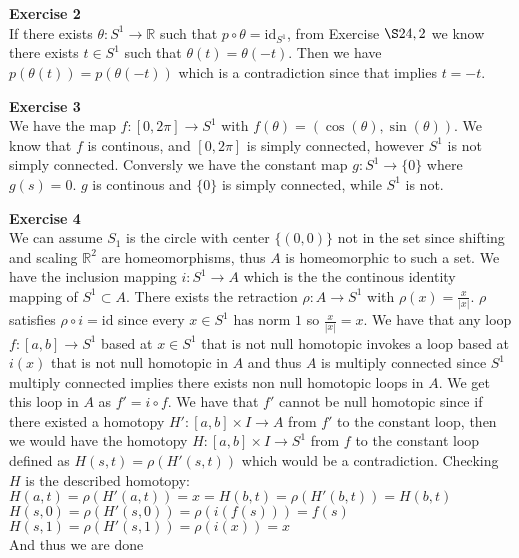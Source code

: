 \documentclass[12pt]{article}
\newenvironment{ques}[1]{\textbf{Exercise #1}\vspace{1 mm}\\ }{\bigskip}
\theoremstyle{definition}
\newcommand{\R}{\mathbb R}
\newcommand{\id}{\text{id}}
\newcommand{\s}{\sin}
\renewcommand{\t}{\theta}
\begin{document}
\begin{ques}{2}
	If there exists $\t : S^1 \to \R$ such that $p \circ \t = \id_{S^1}$, from
	Exercise $\S 24, 2$ we know there exists $t \in S^1$ such that $\t(t) =
	\t(-t)$. Then we have $p(\t(t)) = p(\t(-t))$ which is a contradiction since
	that implies $t = -t$.
\end{ques}

\begin{ques}{3}
	We have the map $f: [0,2\pi] \to S^1$ with $f(\theta) = (\cos(\t),
	\s(\t))$. We know that $f$ is continous, and $[0, 2\pi] $ is simply
	connected, however $S^1$ is not simply connected. Conversly we have the
	constant map $g: S^1 \to \{0\}$ where $g(s) = 0$. $g$ is continous and
	$\{0\}$ is simply connected, while $S^1$ is not.
\end{ques}

\begin{ques}{4}
	We can assume $S_1$ is the circle with center $\{(0,0)\}$ not in the set
	since shifting and scaling $\R^2$ are homeomorphisms, thus $A$ is
	homeomorphic to such a set. We have the inclusion mapping $i:S^1 \to A$
	which is the the continous identity mapping of $S^1 \subset A$. There exists the
	retraction $\rho: A \to S^1$ with $\rho(x) = \frac x {|x|}$. $\rho$ satisfies
	$\rho \circ i = \id$ since every $x \in S^1$ has norm $1$ so $\frac x {|x|}
	= x$. We have that any loop $f:[a,b] \to S^1$ based at $x \in S^1$ that is
	not null homotopic invokes a loop based at $i(x)$ that is not null
	homotopic in $A$ and thus $A$ is multiply connected since $S^1$ multiply
	connected implies there exists non null homotopic loops in $A$. We get this
	loop in $A$ as $f' = i \circ f$. We have that $f'$ cannot be null homotopic
	since if there existed a homotopy $H': [a,b] \times I \to A$ from $f'$ to
	the constant loop, then we would have the homotopy $H: [a,b] \times I \to
	S^1$ from $f$ to the constant loop defined as $H(s,t) = \rho(H'(s,t))$
	which would be a contradiction. Checking $H$ is the described homotopy:\\
	$H(a,t) = \rho(H'(a,t)) = x = H(b,t) = \rho(H'(b,t)) = H(b,t)$\\
	$H(s,0) = \rho(H'(s,0)) = \rho(i(f(s))) = f(s)$\\
	$H(s,1) = \rho(H'(s,1)) = \rho(i(x)) = x$\\
	And thus we are done
\end{ques}
\end{document}
